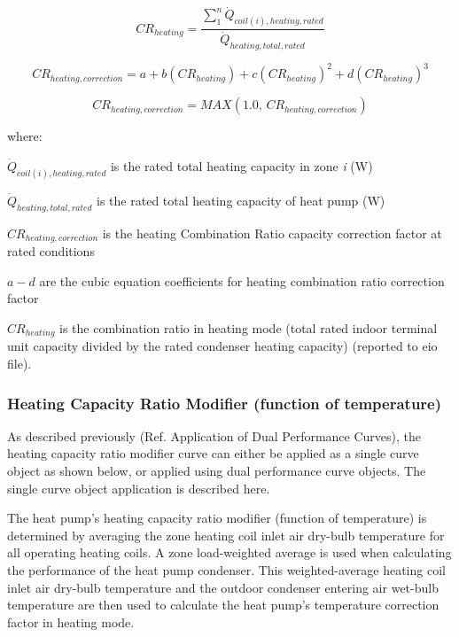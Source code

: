 \begin{equation}
  CR_{heating} = \frac{\sum\limits_1^n \dot{Q}_{coil(i),heating,rated}}{\dot{Q}_{heating,total,rated}}
\end{equation}

\begin{equation}
  CR_{heating,correction} = a + b \left( CR_{heating} \right) + c \left( CR_{heating} \right)^2 + d \left( CR_{heating} \right)^3
\end{equation}

\begin{equation}
  CR_{heating,correction} = MAX \left( 1.0,\,CR_{heating,correction} \right)
\end{equation}

where:

\(\dot{Q}_{coil(i),heating,rated}\) is the rated total heating capacity in zone \emph{i} (W)

\(\dot{Q}_{heating,total,rated}\) is the rated total heating capacity of heat pump (W)

\(CR_{heating,correction}\) is the heating Combination Ratio capacity correction factor at rated conditions

\(a - d\) are the cubic equation coefficients for heating combination ratio correction factor

\(CR_{heating}\) is the combination ratio in heating mode (total rated indoor terminal unit capacity divided by the rated condenser heating capacity) (reported to eio file).

\subsubsection{Heating Capacity Ratio Modifier (function of temperature)}\label{heating-capacity-ratio-modifier-function-of-temperature}

As described previously (Ref. Application of Dual Performance Curves), the heating capacity ratio modifier curve can either be applied as a single curve object as shown below, or applied using dual performance curve objects. The single curve object application is described here.

The heat pump's heating capacity ratio modifier (function of temperature) is determined by averaging the zone heating coil inlet air dry-bulb temperature for all operating heating coils. A zone load-weighted average is used when calculating the performance of the heat pump condenser. This weighted-average heating coil inlet air dry-bulb temperature and the outdoor condenser entering air wet-bulb temperature are then used to calculate the heat pump's temperature correction factor in heating mode.

